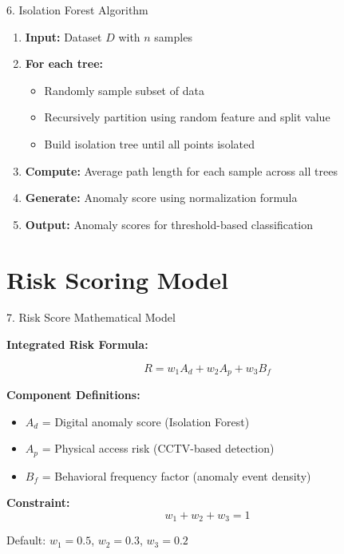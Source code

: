 \documentclass[aspectratio=169]{beamer}
\begin{document}
\begin{frame}{6. Isolation Forest Algorithm}

\begin{enumerate}
    \item \textbf{Input:} Dataset $D$ with $n$ samples
    \vspace{0.2cm}
    
    \item \textbf{For each tree:}
    \begin{itemize}
        \item Randomly sample subset of data
        \item Recursively partition using random feature and split value
        \item Build isolation tree until all points isolated
    \end{itemize}
    \vspace{0.2cm}
    
    \item \textbf{Compute:} Average path length for each sample across all trees
    \vspace{0.2cm}
    
    \item \textbf{Generate:} Anomaly score using normalization formula
    \vspace{0.2cm}
    
    \item \textbf{Output:} Anomaly scores for threshold-based classification
\end{enumerate}

\end{frame}


\section{Risk Scoring Model}

\begin{frame}{7. Risk Score Mathematical Model}

\textbf{Integrated Risk Formula:}

\[
R = w_1 A_d + w_2 A_p + w_3 B_f
\]

\vspace{0.3cm}

\textbf{Component Definitions:}
\begin{itemize}
    \item $A_d$ = Digital anomaly score (Isolation Forest)
    \item $A_p$ = Physical access risk (CCTV-based detection)
    \item $B_f$ = Behavioral frequency factor (anomaly event density)
\end{itemize}

\vspace{0.3cm}

\textbf{Constraint:}
\[
w_1 + w_2 + w_3 = 1
\]

{\small Default: $w_1 = 0.5$, $w_2 = 0.3$, $w_3 = 0.2$}

\end{frame}
\end{document}
